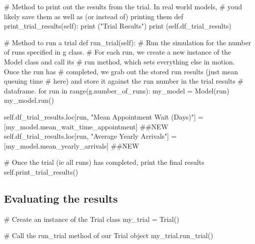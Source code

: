 \documentclass[
  letterpaper,
  DIV=11,
  numbers=noendperiod]{scrreprt}
\newenvironment{Shaded}{}{}
\newcommand{\BuiltInTok}[1]{\textcolor[rgb]{0.84,0.23,0.29}{#1}}
\newcommand{\CommentTok}[1]{\textcolor[rgb]{0.42,0.45,0.49}{#1}}
\newcommand{\ControlFlowTok}[1]{\textcolor[rgb]{0.84,0.23,0.29}{#1}}
\newcommand{\KeywordTok}[1]{\textcolor[rgb]{0.84,0.23,0.29}{#1}}
\newcommand{\NormalTok}[1]{\textcolor[rgb]{0.14,0.16,0.18}{#1}}
\newcommand{\OperatorTok}[1]{\textcolor[rgb]{0.14,0.16,0.18}{#1}}
\newcommand{\StringTok}[1]{\textcolor[rgb]{0.01,0.18,0.38}{#1}}
\newcommand{\VariableTok}[1]{\textcolor[rgb]{0.89,0.38,0.04}{#1}}
\begin{document}
\begin{tcolorbox}
\begin{Shaded}
\begin{Highlighting}[]
    \CommentTok{\# Method to print out the results from the trial.  In real world models,}
    \CommentTok{\# you\textquotesingle{}d likely save them as well as (or instead of) printing them}
    \KeywordTok{def}\NormalTok{ print\_trial\_results(}\VariableTok{self}\NormalTok{):}
        \BuiltInTok{print}\NormalTok{ (}\StringTok{"Trial Results"}\NormalTok{)}
        \BuiltInTok{print}\NormalTok{ (}\VariableTok{self}\NormalTok{.df\_trial\_results)}

    \CommentTok{\# Method to run a trial}
    \KeywordTok{def}\NormalTok{ run\_trial(}\VariableTok{self}\NormalTok{):}
        \CommentTok{\# Run the simulation for the number of runs specified in g class.}
        \CommentTok{\# For each run, we create a new instance of the Model class and call its}
        \CommentTok{\# run method, which sets everything else in motion.  Once the run has}
        \CommentTok{\# completed, we grab out the stored run results (just mean queuing time}
        \CommentTok{\# here) and store it against the run number in the trial results}
        \CommentTok{\# dataframe.}
        \ControlFlowTok{for}\NormalTok{ run }\KeywordTok{in} \BuiltInTok{range}\NormalTok{(g.number\_of\_runs):}
\NormalTok{            my\_model }\OperatorTok{=}\NormalTok{ Model(run)}
\NormalTok{            my\_model.run()}

            \VariableTok{self}\NormalTok{.df\_trial\_results.loc[run, }\StringTok{"Mean Appointment Wait (Days)"}\NormalTok{] }\OperatorTok{=}\NormalTok{ [my\_model.mean\_wait\_time\_appointment] }\CommentTok{\#\#NEW}
            \VariableTok{self}\NormalTok{.df\_trial\_results.loc[run, }\StringTok{"Average Yearly Arrivals"}\NormalTok{] }\OperatorTok{=}\NormalTok{ [my\_model.mean\_yearly\_arrivals] }\CommentTok{\#\#NEW}

        \CommentTok{\# Once the trial (ie all runs) has completed, print the final results}
        \VariableTok{self}\NormalTok{.print\_trial\_results()}
\end{Highlighting}
\end{Shaded}

\end{tcolorbox}

\subsection{Evaluating the results}\label{evaluating-the-results}

\begin{Shaded}
\begin{Highlighting}[]
\CommentTok{\# Create an instance of the Trial class}
\NormalTok{my\_trial }\OperatorTok{=}\NormalTok{ Trial()}

\CommentTok{\# Call the run\_trial method of our Trial object}
\NormalTok{my\_trial.run\_trial()}
\end{Highlighting}
\end{Shaded}
\end{document}

